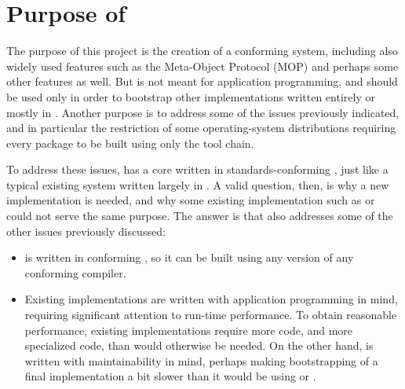 \section{Purpose of \sysname{}}

The purpose of this project is the creation of a conforming
\commonlisp{} system, including also widely used features such as the
Meta-Object Protocol (MOP) and perhaps some other features as well.
But \sysname{} is not meant for application programming, and should be
used only in order to bootstrap other \commonlisp{} implementations
written entirely or mostly in \commonlisp{}.  Another purpose is to
address some of the issues previously indicated, and in particular the
restriction of some operating-system distributions requiring every
package to be built using only the \clanguage{} tool chain.

To address these issues, \sysname{} has a core written in
standards-conforming \clanguage{}, just like a typical existing
\commonlisp{} system written largely in \clanguage{}.  A valid
question, then, is why a new \commonlisp{} implementation is needed,
and why some existing implementation such as \ecl{} or \clisp{} could
not serve the same purpose.  The answer is that \sysname{} also
addresses some of the other issues previously discussed:

\begin{itemize}
\item \sysname{} is written in conforming \clanguage{}, so it can be
  built using any version of any conforming \clanguage{} compiler.
\item Existing implementations are written with application
  programming in mind, requiring significant attention to run-time
  performance.  To obtain reasonable performance, existing
  implementations require more code, and more specialized code, than
  would otherwise be needed.  On the other hand, \sysname{} is written
  with maintainability in mind, perhaps making bootstrapping of a
  final \commonlisp{} implementation a bit slower than it would be
  using \ecl{} or \clisp{}.
\end{itemize}


